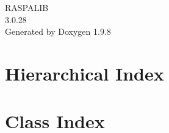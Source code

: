 \documentclass[twoside]{book}
\newcommand{\+}{\discretionary{\mbox{\scriptsize$\hookleftarrow$}}{}{}}
\newcommand{\clearemptydoublepage}{%
    \newpage{\pagestyle{empty}\cleardoublepage}%
  }
\begin{document}
  \raggedbottom
    \hypersetup{pageanchor=false,
                bookmarksnumbered=true,
                pdfencoding=unicode
               }
  \begin{titlepage}
  \vspace*{7cm}
  \begin{center}%
  {\Large RASPALIB}\\
  [1ex]\large 3.\+0.\+28 \\
  \vspace*{1cm}
  {\large Generated by Doxygen 1.9.8}\\
  \end{center}
  \end{titlepage}
  \clearemptydoublepage
  \tableofcontents
  \clearemptydoublepage
  \hypersetup{pageanchor=true}


\chapter{Hierarchical Index}

\chapter{Class Index}

\end{document}

